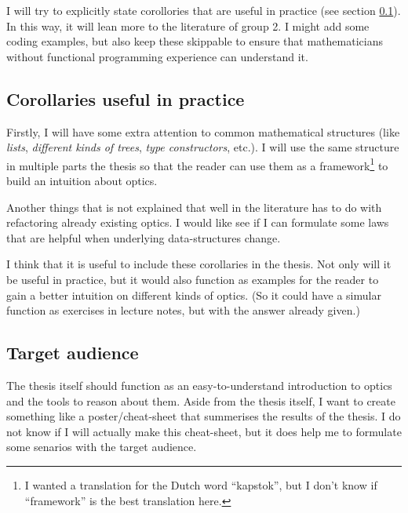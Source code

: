 \documentclass{article}
\begin{document}
I will try to explicitly state corollories that are useful in practice (see section \ref{sec:practical-corollaries}). In this way, it will lean more to the literature of group 2. I might add some coding examples, but also keep these skippable to ensure that mathematicians without functional programming experience can understand it.

\subsection{Corollaries useful in practice} \label{sec:practical-corollaries}

Firstly, I will have some extra attention to common mathematical structures (like \emph{lists}, \emph{different kinds of trees}, \emph{type constructors}, etc.). I will use the same structure in multiple parts the thesis so that the reader can use them as a framework\footnote{I wanted a translation for the Dutch word ``kapstok'', but I don't know if ``framework'' is the best translation here.} to build an intuition about optics.

\medskip

Another things that is not explained that well in the literature has to do with refactoring already existing optics. I would like see if I can formulate some laws that are helpful when underlying data-structures change.

\medskip

I think that it is useful to include these corollaries in the thesis. Not only will it be useful in practice, but it would also function as examples for the reader to gain a better intuition on different kinds of optics. (So it could have a simular function as exercises in lecture notes, but with the answer already given.)

\subsection{Target audience} \label{sec:target-audience}
The thesis itself should function as an easy-to-understand introduction to optics and the tools to reason about them. Aside from the thesis itself, I want to create something like a poster/cheat-sheet that summerises the results of the thesis. I do not know if I will actually make this cheat-sheet, but it does help me to formulate some senarios with the target audience.

\bigskip
\end{document}
